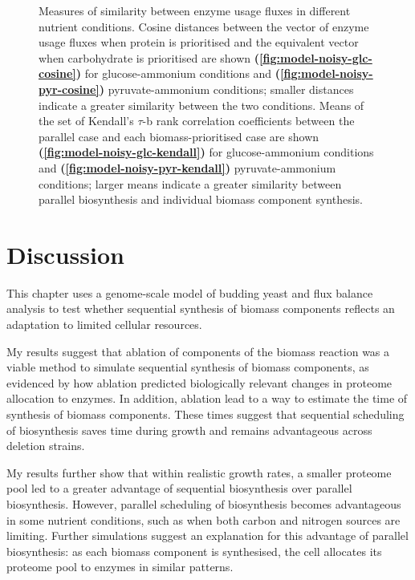 \begin{figure}
  \caption[
    Measures of similarity between enzyme usage fluxes in different nutrient conditions
  ]{
    Measures of similarity between enzyme usage fluxes in different nutrient conditions.
    Cosine distances between the vector of enzyme usage fluxes when protein is prioritised and the equivalent vector when carbohydrate is prioritised are shown \textbf{(\ref{fig:model-noisy-glc-cosine})} for glucose-ammonium conditions and \textbf{(\ref{fig:model-noisy-pyr-cosine})} pyruvate-ammonium conditions; smaller distances indicate a greater similarity between the two conditions.
    Means of the set of Kendall's $\tau$-b rank correlation coefficients between the parallel case and each biomass-prioritised case are shown \textbf{(\ref{fig:model-noisy-glc-kendall})} for glucose-ammonium conditions and \textbf{(\ref{fig:model-noisy-pyr-kendall})} pyruvate-ammonium conditions; larger means indicate a greater similarity between parallel biosynthesis and individual biomass component synthesis.
    }
  \label{fig:model-noisy}
\end{figure}


\section{Discussion}
\label{subsec:model-discussion}

This chapter uses a genome-scale model of budding yeast and flux balance analysis to test whether sequential synthesis of biomass components reflects an adaptation to limited cellular resources.

My results suggest that ablation of components of the biomass reaction was a viable method to simulate sequential synthesis of biomass components, as evidenced by how ablation predicted biologically relevant changes in proteome allocation to enzymes.
In addition, ablation lead to a way to estimate the time of synthesis of biomass components.
These times suggest that sequential scheduling of biosynthesis saves time during growth and remains advantageous across deletion strains.

My results further show that within realistic growth rates, a smaller proteome pool led to a greater advantage of sequential biosynthesis over parallel biosynthesis.
However, parallel scheduling of biosynthesis becomes advantageous in some nutrient conditions, such as when both carbon and nitrogen sources are limiting.
Further simulations suggest an explanation for this advantage of parallel biosynthesis: as each biomass component is synthesised, the cell allocates its proteome pool to enzymes in similar patterns.

